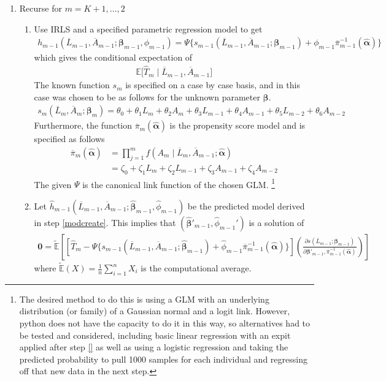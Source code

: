 \begin{enumerate}
\item Recurse for $m = K+1, \dots, 2$ 
\begin{enumerate}
\item \label{modcreate} Use IRLS and a specified parametric regression model to get
\begin{align}
h_{m-1}(\overline{L}_{m-1}, \overline{A}_{m-1}; \mathbf{\beta}_{m-1}, \phi_{m-1}) = \Psi \{s_{m-1}(\overline{L}_{m-1}, \overline{A}_{m-1}; \mathbf{\beta}_{m-1}) + \phi_{m-1} \overline{\pi}_{m-1}^{-1} (\hat{\mathbf{\alpha}}) \}
\end{align}
which gives the conditional expectation of 
\begin{align}
\mathbb{E} \bigg[\hat{T}_m \mid \overline{L}_{m-1}, \overline{A}_{m-1} \bigg]
\end{align} 
The known function $s_{m}$ is specified on a case by case basis, and in this case was chosen to be as follows for the unknown parameter $\mathbf{\beta}$.  
\begin{align}
s_{m}(\overline{L}_{m}, \overline{A}_{m};\mathbf{\beta}_{m}) = \theta_0 + \theta_1 L_{m} +\theta_2 A_{m} + \theta_3 L_{m-1} +\theta_4 A_{m-1}+ \theta_5 L_{m-2} +\theta_6 A_{m-2}
\end{align}
Furthermore, the function $\overline{\pi}_m(\hat{\mathbf{\alpha}})$ is the propensity score model and is specified as follows
\begin{align} 
\overline{\pi}_m(\hat{\mathbf{\alpha}}) &= \prod_{j=1}^m f(A_m \mid \overline{L}_m, \overline{A}_{m-1}; \hat{\mathbf{\alpha}}) \\
&= \zeta_0 + \zeta_1 L_m + \zeta_2 L_{m-1} + \zeta_3 A_{m-1} + \zeta_4 A_{m-2}
\end{align}
The given $\Psi$ is the canonical link function of the chosen GLM.  \footnote{The desired method to do this is using a GLM with an underlying distribution (or family) of a Gaussian normal and a logit link.  However, python does not have the capacity to do it in this way, so alternatives had to be tested and considered, including basic linear regression with an expit applied after step \ref{} as well as using a logistic regression and taking the predicted probability to pull 1000 samples for each individual and regressing off that new data in the next step.}

\item Let $ \hat{h}_{m-1}(\overline{L}_{m-1}, \overline{A}_{m-1}; \hat{\mathbf{\beta}}_{m-1}, \hat{\phi}_{m-1})$ be the predicted model derived in step \ref{modcreate}.  This implies that $(\hat{\mathbf{\beta}}'_{m-1}, \hat{\phi}_{m-1}')$ is a solution of 
\begin{align}
\mathbf{0} = \tilde{\mathbb{E}} \left[ \left[\hat{T}_{m} - \Psi \{ s_{m-1}(\overline{L}_{m-1}, \overline{A}_{m-1}; \hat{\mathbf{\beta}}_{m-1}) + \hat{\phi}_{m-1} \overline{\pi}^{-1}_{m-1}(\hat{\mathbf{\alpha}}) \} \right] \left( \frac{\partial s (\overline{L}_{m-1}; \mathbf{\beta}_{m-1})}{\partial \mathbf{\beta}'_{m-1}, \overline{\pi}^{-1}_{m-1}(\hat{\mathbf{\alpha}})} \right) \right]
\end{align}
where $\tilde{\mathbb{E}}(X) = \frac{1}{n} \sum_{i=1}^n X_i$ is the computational average.  


\end{enumerate}
\end{enumerate}
